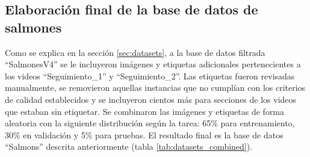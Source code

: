 \subsection{Elaboración final de la base de datos de salmones}
Como se explica en la sección \ref{sec:datasets}, a la base de datos filtrada ``SalmonesV4'' se le incluyeron imágenes y etiquetas adicionales pertenecientes a los videos ``Seguimiento_1'' y ``Seguimiento_2''. Las etiquetas fueron revisadas manualmente, se removieron aquellas instancias que no cumplían con los criterios de calidad establecidos y se incluyeron cientos más para secciones de los videos que estaban sin etiquetar. Se combinaron las imágenes y etiquetas de forma aleatoria con la siguiente distribución según la tarea: 65\% para entrenamiento, 30\% en validación y 5\% para pruebas. El resultado final es la base de datos ``Salmons'' descrita anteriormente (tabla \ref{tab:datasets_combined}).
